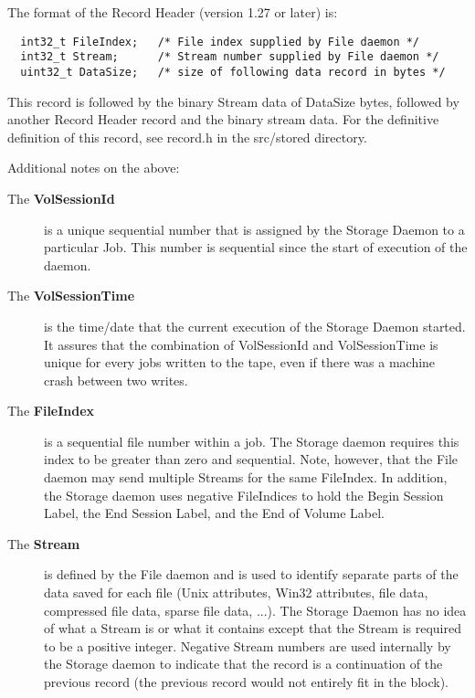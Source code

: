 The format of the Record Header (version 1.27 or later) is:

\footnotesize
\begin{verbatim}
  int32_t FileIndex;   /* File index supplied by File daemon */
  int32_t Stream;      /* Stream number supplied by File daemon */
  uint32_t DataSize;   /* size of following data record in bytes */
\end{verbatim}
\normalsize

This record is followed by the binary Stream data of DataSize bytes, followed
by another Record Header record and the binary stream data. For the definitive
definition of this record, see record.h in the src/stored directory.

Additional notes on the above:

\begin{description}

\item [The {\bf VolSessionId} ]
   is a unique sequential number that is  assigned by the Storage Daemon to a
particular Job. This number  is sequential since the start of execution of the
daemon.

\item [The {\bf VolSessionTime} ]
   is the time/date that the current execution  of the Storage Daemon started. It
assures that the combination of  VolSessionId and VolSessionTime is unique for
every jobs written  to the tape, even if there was a machine crash between two
writes.

\item [The {\bf FileIndex} ]
   is a sequential file number within a job.  The Storage daemon requires this
index to be greater than zero and  sequential. Note, however, that the File
daemon may send multiple  Streams for the same FileIndex. In addition, the
Storage daemon uses  negative FileIndices to hold the Begin Session Label, the
End Session  Label, and the End of Volume Label.

\item [The {\bf Stream} ]
   is defined by the File daemon and is  used to identify separate parts of the
data saved for each file  (Unix attributes, Win32 attributes, file data,
compressed file data,  sparse file data, ...). The Storage Daemon has no idea
of what a Stream is or what it contains except that the Stream  is required to
be a positive integer. Negative Stream numbers are  used internally by the
Storage daemon to indicate that the record  is a continuation of the previous
record (the previous record would  not entirely fit in the block).


\end{description}
